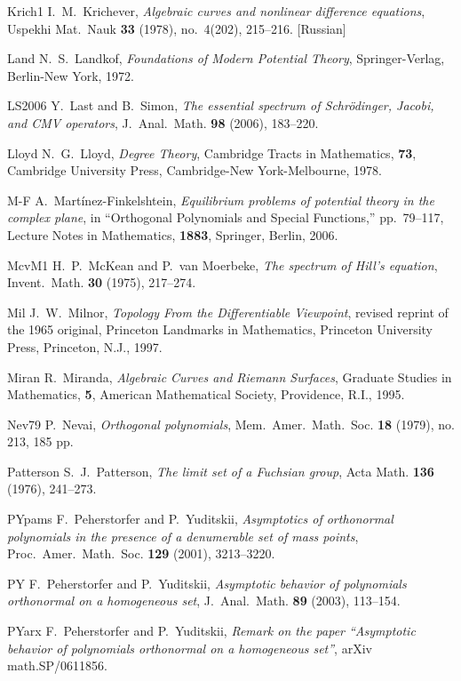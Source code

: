 \documentclass[reqno,centertags, 12pt]{amsart}
\numberwithin{equation}{section}
\theoremstyle{definition}
\begin{document}
\begin{thebibliography}{999}
{\bibitem}{Krich1} I.~M.~Krichever, {\it Algebraic curves and nonlinear
difference equations}, Uspekhi Mat.\ Nauk {\bf 33} (1978), no.\
4(202), 215--216. [Russian]

{\bibitem}{Land} N.~S.~Landkof, \textit{Foundations of Modern Potential
Theory}, Springer-Verlag, Berlin-New York, 1972.

{\bibitem}{LS2006} Y.~Last and B.~Simon, {\it The essential spectrum of
Schr\"odinger, Jacobi, and CMV operators}, J.\ Anal.\ Math. {\bf 98}
(2006), 183--220.

{\bibitem}{Lloyd} N.~G.~Lloyd, \textit{Degree Theory}, Cambridge Tracts in
Mathematics, {\bf 73}, Cambridge University  Press, Cambridge-New York-Melbourne,
1978.

{\bibitem}{M-F} A.~Mart\'inez-Finkelshtein, {\it Equilibrium problems of
potential theory in the complex plane}, in ``Orthogonal Polynomials
and Special Functions,'' pp.~79--117, Lecture Notes in Mathematics,
{\bf 1883}, Springer, Berlin, 2006.

{\bibitem}{McvM1} H.~P.~McKean and P.~van Moerbeke, {\it The spectrum of
Hill's equation}, Invent.\ Math. {\bf 30} (1975),  217--274.

{\bibitem}{Mil} J.~W.~Milnor, \textit{Topology From the Differentiable
Viewpoint}, revised reprint of the 1965 original, Princeton
Landmarks in Mathematics, Princeton University  Press, Princeton, N.J.,
1997.

{\bibitem}{Miran} R.~Miranda, \textit{Algebraic Curves and Riemann
Surfaces}, Graduate Studies in Mathematics, {\bf 5}, American Mathematical
Society, Providence, R.I., 1995.

{\bibitem}{Nev79} P.~Nevai, {\it Orthogonal polynomials}, Mem.\ Amer.\
Math.\ Soc. {\bf 18} (1979), no. 213, 185 pp.

{\bibitem}{Patterson} S.~J.~Patterson, {\it The limit set of a Fuchsian
group}, Acta Math. {\bf 136} (1976), 241--273.

{\bibitem}{PYpams} F.~Peherstorfer and P.~Yuditskii, \emph{Asymptotics of
orthonormal polynomials in the presence of a  denumerable set of
mass points}, Proc.\ Amer.\ Math.\ Soc. {\bf 129} (2001),
3213--3220.

{\bibitem}{PY} F.~Peherstorfer and P.~Yuditskii, \emph{Asymptotic behavior
of polynomials orthonormal on a homogeneous set}, J.\ Anal.\ Math.
{\bf 89} (2003), 113--154.

{\bibitem}{PYarx} F.~Peherstorfer and P.~Yuditskii, \emph{Remark on the
paper ``Asymptotic behavior of polynomials orthonormal on a
homogeneous set''}, arXiv math.SP/0611856.


\end{thebibliography}
\end{document}
